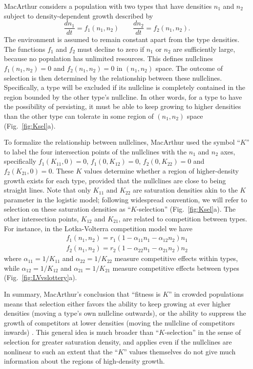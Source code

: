 \documentclass[12pt]{article}
\begin{document}
MacArthur considers a population with two types that have densities $n_1$ and $n_2$ subject to density-dependent growth described by
\begin{equation}
\frac{d n_1}{d t}=f_1(n_1,n_2)\qquad\frac{d n_2}{d t}=f_2(n_1,n_2). \label{eq:macgeneral}
\end{equation}
The environment is assumed to remain constant apart from the type densities. The functions $f_1$ and $f_2$ must decline to zero if $n_1$ or $n_2$ are sufficiently large, because no population has unlimited resources. This defines nullclines $f_1(n_1,n_2)=0$ and $f_2(n_1,n_2)=0$ in $(n_1,n_2)$ space. The outcome of selection is then determined by the relationship between these nullclines. Specifically, a type will be excluded if its nullcline is completely contained in the region bounded by the other type's nullcline. In other words, for a type to have the possibility of persisting, it must be able to keep growing to higher densities than the other type can tolerate in some region of $(n_1,n_2)$ space (Fig.~\ref{fig:Ksel}a).

To formalize the relationship between nullclines, MacArthur used the symbol ``$K$'' to label the four intersection points of the nullclines with the $n_1$ and $n_2$ axes, specifically $f_1(K_{11},0)=0$, $f_1(0,K_{12})=0$, $f_2(0,K_{22})=0$ and $f_2(K_{21},0)=0$. These $K$ values determine whether a region of higher-density growth exists for each type, provided that the nullclines are close to being straight lines. Note that only $K_{11}$ and $K_{22}$ are saturation densities akin to the $K$ parameter in the logistic model; following widespread convention, we will refer to selection on these saturation densities as ``$K$-selection'' (Fig.~\ref{fig:Ksel}a). The other intersection points, $K_{12}$ and $K_{21}$, are related to competition between types. For instance, in the Lotka-Volterra competition model we have
\begin{align}
f_1(n_1,n_2) = r_1(1-\alpha_{11}n_1-\alpha_{12}n_2)n_1\nonumber\\
f_2(n_1,n_2) = r_2(1-\alpha_{22}n_1-\alpha_{21}n_2)n_2\label{eq:LV}
\end{align}
where $\alpha_{11}=1/K_{11}$ and $\alpha_{22}=1/K_{22}$ measure competitive effects within types, while $\alpha_{12}=1/K_{12}$ and $\alpha_{21}=1/K_{21}$ measure competitive effects between types (Fig.~\ref{fig:LVvslottery}a). 

In summary, MacArthur's conclusion that  ``fitness is $K$'' in crowded populations \citep[pp. 149]{macarthur_1967} means that selection either favors the ability to keep growing at ever higher densities (moving a type's own nullcline outwards), or the ability to suppress the growth of competitors at lower densities (moving the nullcline of competitors inwards) \citep{gill_1974}. This general idea is much broader than ``$K$-selection'' in the sense of selection for greater saturation density, and applies even if the nullclines are nonlinear to such an extent that the ``$K$'' values themselves do not give much information about the regions of high-density growth.
\end{document}
